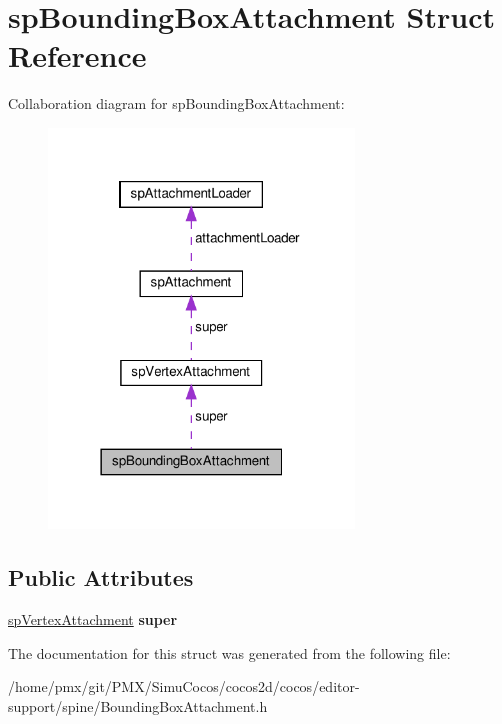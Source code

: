 \hypertarget{structspBoundingBoxAttachment}{}\section{sp\+Bounding\+Box\+Attachment Struct Reference}
\label{structspBoundingBoxAttachment}


Collaboration diagram for sp\+Bounding\+Box\+Attachment\+:
\nopagebreak
\begin{figure}[H]
\begin{center}
\leavevmode
\includegraphics[width=230pt]{structspBoundingBoxAttachment__coll__graph}
\end{center}
\end{figure}
\subsection*{Public Attributes}
\begin{DoxyCompactItemize}
\item 
\mbox{\label{structspBoundingBoxAttachment_a44e6b7b43bda2f4e88591f7bf9fd2b21}} 
\hyperlink{structspVertexAttachment}{sp\+Vertex\+Attachment} {\bfseries super}
\end{DoxyCompactItemize}


The documentation for this struct was generated from the following file\+:\begin{DoxyCompactItemize}
\item 
/home/pmx/git/\+P\+M\+X/\+Simu\+Cocos/cocos2d/cocos/editor-\/support/spine/Bounding\+Box\+Attachment.\+h\end{DoxyCompactItemize}
